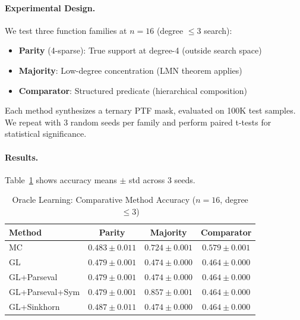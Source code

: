 \documentclass[Royal,times,sageh]{sagej}
\begin{document}
\paragraph{Experimental Design.} We test three function families at $n=16$ (degree $\leq 3$ search):
\begin{itemize}
    \item \textbf{Parity} (4-sparse): True support at degree-4 (outside search space)
    \item \textbf{Majority}: Low-degree concentration (LMN theorem applies)
    \item \textbf{Comparator}: Structured predicate (hierarchical composition)
\end{itemize}

Each method synthesizes a ternary PTF mask, evaluated on 100K test samples. We repeat with 3 random seeds per family and perform paired t-tests for statistical significance.

\paragraph{Results.} Table~\ref{tab:oracle_comparison} shows accuracy means $\pm$ std across 3 seeds.

\begin{table}[h]
\centering
\caption{Oracle Learning: Comparative Method Accuracy ($n=16$, degree $\leq 3$)}
\label{tab:oracle_comparison}
\small
\begin{tabular}{lccc}
\toprule
\textbf{Method} & \textbf{Parity} & \textbf{Majority} & \textbf{Comparator} \\
\midrule
MC & $0.483 \pm 0.011$ & $0.724 \pm 0.001$ & $0.579 \pm 0.001$ \\
GL & $0.479 \pm 0.001$ & $0.474 \pm 0.000$ & $0.464 \pm 0.000$ \\
GL+Parseval & $0.479 \pm 0.001$ & $0.474 \pm 0.000$ & $0.464 \pm 0.000$ \\
GL+Parseval+Sym & $0.479 \pm 0.001$ & $\mathbf{0.857 \pm 0.001}$ & $0.464 \pm 0.000$ \\
GL+Sinkhorn & $0.487 \pm 0.011$ & $0.474 \pm 0.000$ & $0.464 \pm 0.000$ \\
\bottomrule
\end{tabular}
\end{table}
\end{document}
